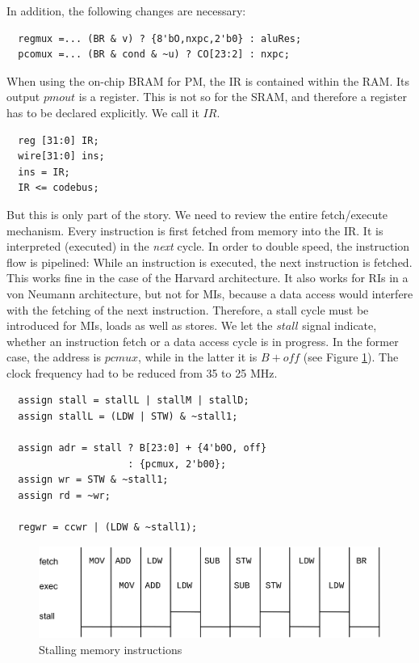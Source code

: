 In addition, the following changes are necessary:
\begin{verbatim}
  regmux =... (BR & v) ? {8'bO,nxpc,2'b0} : aluRes;
  pcomux =... (BR & cond & ~u) ? CO[23:2] : nxpc;
\end{verbatim}

When using the on-chip BRAM for PM, the IR is contained within the RAM. Its output $pmout$ is a
register. This is not so for the SRAM, and therefore a register has to be declared explicitly. We
call it $IR$.
\begin{verbatim}
  reg [31:0] IR;
  wire[31:0] ins;
  ins = IR;
  IR <= codebus;
\end{verbatim}

But this is only part of the story. We need to review the entire fetch/execute mechanism. Every
instruction is first fetched from memory into the IR. It is interpreted (executed) in the
\emph{next} cycle. In order to double speed, the instruction flow is pipelined: While an instruction
is executed, the next instruction is fetched. This works fine in the case of the Harvard
architecture. It also works for RIs in a von Neumann architecture, but not for MIs, because a data
access would interfere with the fetching of the next instruction. Therefore, a stall cycle must be
introduced for MIs, loads as well as stores. We let the $stall$ signal indicate, whether an
instruction fetch or a data access cycle is in progress. In the former case, the address is $pcmux$,
while in the latter it is $B + off$ (see Figure \ref{fig:smi}). The clock frequency had to be
reduced from 35 to 25 MHz.
\begin{verbatim}
  assign stall = stallL | stallM | stallD;
  assign stallL = (LDW | STW) & ~stall1;
 
  assign adr = stall ? B[23:0] + {4'b0O, off}
                     : {pcmux, 2'b00};
  assign wr = STW & ~stall1;
  assign rd = ~wr;
 
  regwr = ccwr | (LDW & ~stall1);
\end{verbatim}
\begin{figure}[h!]
  \centering
  \includegraphics[width=.9\textwidth]{i/e.png}
  \caption{Stalling memory instructions}
  \label{fig:smi}
\end{figure}

